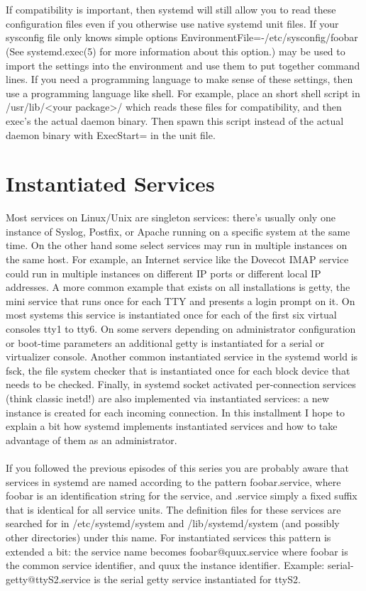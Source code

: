 \documentclass[titlepage]{article}
\begin{document}
\\
\\
If compatibility is important, then systemd will still allow you to read these configuration files even if you otherwise use native systemd unit files. If your sysconfig file only knows simple options EnvironmentFile=-/etc/sysconfig/foobar (See systemd.exec(5) for more information about this option.) may be used to import the settings into the environment and use them to put together command lines. If you need a programming language to make sense of these settings, then use a programming language like shell. For example, place an short shell script in /usr/lib/<your package>/ which reads these files for compatibility, and then exec's the actual daemon binary. Then spawn this script instead of the actual daemon binary with ExecStart= in the unit file.
\section{Instantiated Services}
Most services on Linux/Unix are singleton services: there's usually only one instance of Syslog, Postfix, or Apache running on a specific system at the same time. On the other hand some select services may run in multiple instances on the same host. For example, an Internet service like the Dovecot IMAP service could run in multiple instances on different IP ports or different local IP addresses. A more common example that exists on all installations is getty, the mini service that runs once for each TTY and presents a login prompt on it. On most systems this service is instantiated once for each of the first six virtual consoles tty1 to tty6. On some servers depending on administrator configuration or boot-time parameters an additional getty is instantiated for a serial or virtualizer console. Another common instantiated service in the systemd world is fsck, the file system checker that is instantiated once for each block device that needs to be checked. Finally, in systemd socket activated per-connection services (think classic inetd!) are also implemented via instantiated services: a new instance is created for each incoming connection. In this installment I hope to explain a bit how systemd implements instantiated services and how to take advantage of them as an administrator.
\\
\\
If you followed the previous episodes of this series you are probably aware that services in systemd are named according to the pattern foobar.service, where foobar is an identification string for the service, and .service simply a fixed suffix that is identical for all service units. The definition files for these services are searched for in /etc/systemd/system and /lib/systemd/system (and possibly other directories) under this name. For instantiated services this pattern is extended a bit: the service name becomes foobar@quux.service where foobar is the common service identifier, and quux the instance identifier. Example: serial-getty@ttyS2.service is the serial getty service instantiated for ttyS2.
\end{document}
